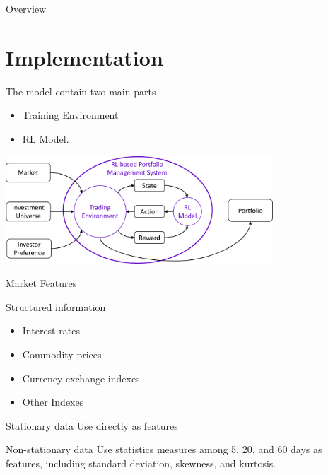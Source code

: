 \begin{frame}{Overview}
\section{Implementation}
The model contain two main parts
\begin{itemize}
    \item Training Environment
    \item RL Model. 
\end{itemize}
\begin{center}
  \includegraphics[width=10cm]{images/context_diagram.png}  
\end{center}
\end{frame}




\begin{frame}{Market Features}
\begin{block}{Structured information}
\begin{itemize}
    \item Interest rates
    \item Commodity prices
    \item Currency exchange indexes
    \item Other Indexes
\end{itemize}
\end{block}
\begin{block}{Stationary data}
   Use directly as features
\end{block}
\begin{block}{Non-stationary data}
    Use statistics measures among 5, 20, and 60 days as features, including standard deviation, skewness, and kurtosis.
\end{block}
\end{frame}


